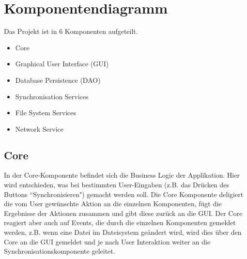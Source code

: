 \section{Komponentendiagramm}


Das Projekt ist in 6 Komponenten aufgeteilt. 
\begin{itemize}
	\item Core
	\item Graphical User Interface (GUI)
	\item Database Persistence (DAO)
	\item Synchronisation Services
	\item File System Services
	\item Network Service
\end{itemize}


\subsection{Core}
In der Core-Komponente befindet sich die Business Logic der Applikation. Hier wird entschieden, was bei bestimmten User-Eingaben (z.B. das Drücken des Buttons ``Synchronisieren") gemacht werden soll. %
Die Core Komponente deligiert die vom User gewünschte Aktion an die einzelnen Komponenten, %
fügt die Ergebnisse der Aktionen zusammen und gibt diese zurück an die GUI. %
Der Core reagiert aber auch auf Events, die durch die einzelnen Komponenten gemeldet werden, z.B. wenn eine Datei im Dateisystem geändert wird, wird dies über den Core an die GUI gemeldet und je nach User Interaktion weiter an die Synchronisationskomponente geleitet. %

